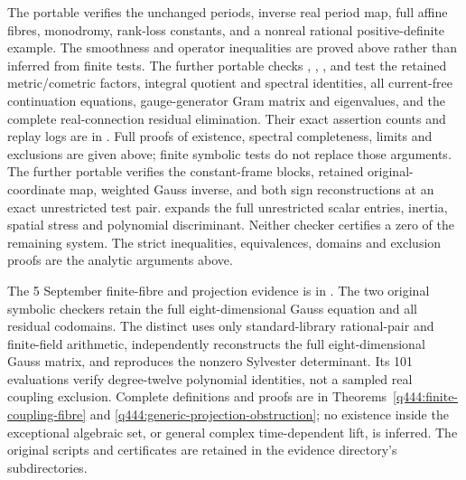 The portable  verifies the unchanged
periods, inverse real period map, full affine fibres, monodromy, rank-loss
constants, and a nonreal rational positive-definite example.
The smoothness and operator inequalities are proved above rather than
inferred from finite tests.
The further portable checks
,
, , and
test the retained metric/cometric factors, integral quotient and spectral
identities, all current-free continuation equations, gauge-generator
Gram matrix and eigenvalues, and the complete real-connection residual
elimination. Their exact assertion counts and replay logs are in
. Full proofs of existence,
spectral completeness, limits and exclusions are given above; finite
symbolic tests do not replace those arguments.
The further portable  verifies the
constant-frame blocks, retained original-coordinate map, weighted
Gauss inverse, and both sign reconstructions at an exact unrestricted
test pair.  expands the full
unrestricted scalar entries, inertia, spatial stress and polynomial
discriminant. Neither checker certifies a zero of the remaining system.
The strict inequalities, equivalences, domains and exclusion proofs are
the analytic arguments above.

The 5 September finite-fibre and projection evidence is in
.
The two original symbolic checkers retain the full eight-dimensional
Gauss equation and all residual codomains. The distinct
 uses only standard-library
rational-pair and finite-field arithmetic, independently reconstructs
the full eight-dimensional Gauss matrix, and reproduces the nonzero
Sylvester determinant. Its 101 evaluations verify degree-twelve
polynomial identities, not a sampled real coupling exclusion.
Complete definitions and proofs are in
Theorems~\ref{q444:finite-coupling-fibre} and
\ref{q444:generic-projection-obstruction}; no existence inside the
exceptional algebraic set, or general complex time-dependent lift,
is inferred. The original scripts and certificates are retained in
the evidence directory's  subdirectories.

